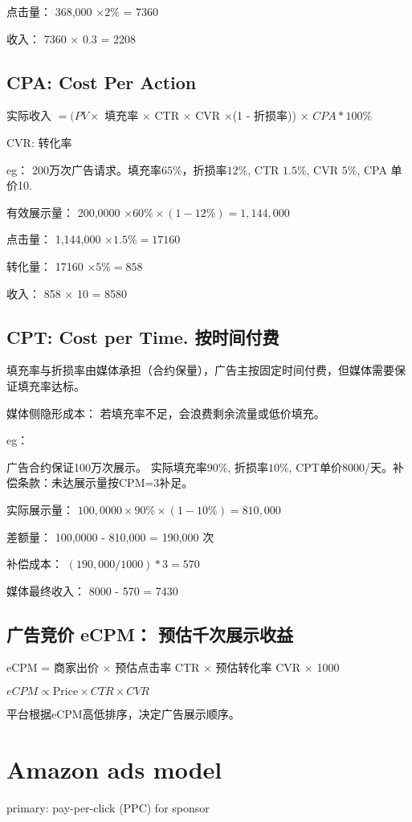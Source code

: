 \documentclass{article}
\begin{document}
点击量： 368,000 $\times 2\%$  = 7360

收入： 7360 $\times$ 0.3 = 2208


\subsection{CPA: Cost Per Action}
 实际收入 $= (PV \times$ 填充率 $\times$ CTR $\times$ CVR $\times$(1 - 折损率)) $\times$ $CPA * 100\% $

 CVR: 转化率

eg：
200万次广告请求。填充率$65\%$，折损率$12\%$, CTR $1.5\%$, CVR $5\%$, CPA 单价10.

有效展示量： 200,0000 $\times 60\% \times (1-12\%) = 1,144,000$

点击量： 1,144,000 $\times 1.5\% = 17160$

转化量： 17160 $ \times 5\% = 858$

收入： 858 $\times$ 10 = 8580


\subsection{CPT: Cost per Time. 按时间付费}
填充率与折损率由媒体承担（合约保量），广告主按固定时间付费，但媒体需要保证填充率达标。

媒体侧隐形成本： 若填充率不足，会浪费剩余流量或低价填充。

eg：

广告合约保证100万次展示。 实际填充率$90\%$, 折损率$10\%$, CPT单价8000/天。补偿条款：未达展示量按CPM=3补足。

实际展示量： $100,0000 \times 90\% \times (1-10\%) = 810,000$

差额量： 100,0000 - 810,000 = 190,000 次 

补偿成本： $(190,000 / 1000) * 3 = 570$ 

媒体最终收入： 8000 - 570 = 7430

\subsection{广告竞价 eCPM： 预估千次展示收益}

eCPM = 商家出价  $\times$ 预估点击率 CTR $\times$ 预估转化率 CVR $\times$ 1000

 $eCPM \varpropto \text{Price} \times CTR \times CVR$ 

平台根据eCPM高低排序，决定广告展示顺序。


\section{Amazon ads model}
primary: pay-per-click (PPC) for sponsor
\end{document}
